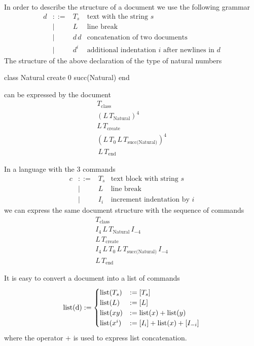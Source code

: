 \documentclass[12pt]{article}
\def\class{\text{class}}
\def\create{\text{create}}
\def\kwend{\text{end}}
\def\Natural{\text{Natural}}
\begin{document}
In order to describe the structure of a document we use the following grammar
$$
\begin{array}{llll}
  d &::=& T_s      & \text{text with the string } s
  \\
    & \mid & L     & \text{line break}
  \\
    & \mid & d\, d & \text{concatenation of two documents}
  \\
    & \mid & d^i   & \text{additional indentation $i$ after newlines in } d
\end{array}
$$%
%
The structure of the above declaration of the type of natural numbers
\begin{alba}
    class
        Natural
    create
        0
        succ(Natural)
    end
\end{alba}
%
can be expressed by the document
$$
\begin{array}{l}
  T_\class \,
  \\
  (L \, T_\Natural)^4 \, \\
  L \, T_\create \, \\
  (L \, T_0 \, L \, T_\text{succ(Natural)})^4 \\
  \, L \, T_\text{end}
\end{array}
$$%

In a language with the 3 commands
$$
\begin{array}{llll}
  c & ::= & T_s         & \text{text block with string } s
  \\
    & \mid &  L         & \text{line break}
  \\
    & \mid &  I_i     & \text{increment indentation by } i
\end{array}
$$%
we can express the same document structure with the sequence of commands
$$
\begin{array}{l}
  T_\class\, \\
  I_4\, L\, T_\Natural\, I_{-4}\, \\
  L\, T_\create\, \\
  I_4\, L\, T_0\, L\, T_\text{succ(Natural)}\, I_{-4} \\
  L\, T_\kwend
\end{array}
$$

It is easy to convert a document into a list of commands
{\def\coms{\text{list}}
  $$
  \text{\coms(d)} :=
  \begin{cases}
    \coms(T_s) &:= [T_s]
    \\
    \coms(L) &:= [L]
    \\
    \coms(x y) &:= \coms(x) + \coms(y)
    \\
    \coms(x^i) &:= [I_i] + \coms(x) + [I_{-i}]
  \end{cases}
  $$
}
where the operator $+$ is used to express list concatenation.
\end{document}
